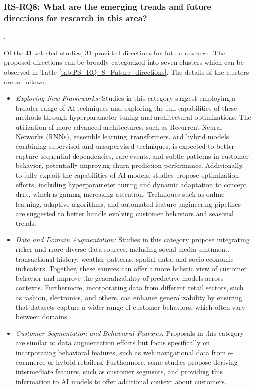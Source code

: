 \documentclass[preprint,12pt]{elsarticle}
\newcommand{\RSRQeight}{RS-RQ8: What are the emerging trends and future directions for research in this area?}
\begin{document}
\subsubsection{\RSRQeight}
.

Of the 41 selected studies, 31 provided directions for future research. The proposed directions can be broadly categorized into seven clusters which can be observed in Table \ref{tab:PS_RQ_8_Future_directions}. The details of the clusters are as follows:

\begin{itemize}

    \item \textit{Exploring New Frameworks:} Studies in this category suggest employing a broader range of AI techniques and exploring the full capabilities of these methods through hyperparameter tuning and architectural optimizations. The utilization of more advanced architectures, such as Recurrent Neural Networks (RNNs), ensemble learning, transformers, and hybrid models combining supervised and unsupervised techniques, is expected to better capture sequential dependencies, rare events, and subtle patterns in customer behavior, potentially improving churn prediction performance. Additionally, to fully exploit the capabilities of AI models, studies propose optimization efforts, including hyperparameter tuning and dynamic adaptation to concept drift, which is gaining increasing attention. Techniques such as online learning, adaptive algorithms, and automated feature engineering pipelines are suggested to better handle evolving customer behaviors and seasonal trends.


    \item \textit{Data and Domain Augmentation:} Studies in this category propose integrating richer and more diverse data sources, including social media sentiment, transactional history, weather patterns, spatial data, and socio-economic indicators. Together, these sources can offer a more holistic view of customer behavior and improve the generalizability of predictive models across contexts. Furthermore, incorporating data from different retail sectors, such as fashion, electronics, and others, can enhance generalizability by ensuring that datasets capture a wider range of customer behaviors, which often vary between domains.
    
    \item \textit{Customer Segmentation and Behavioral Features:} Proposals in this category are similar to data augmentation efforts but focus specifically on incorporating behavioral features, such as web navigational data from e-commerce or hybrid retailers. Furthermore, some studies propose deriving intermediate features, such as customer segments, and providing this information to AI models to offer additional context about customers.
    

\end{itemize}
\end{document}
